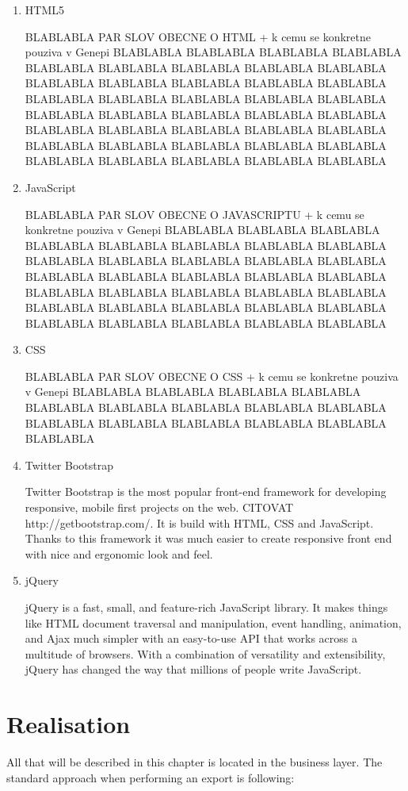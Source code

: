 \documentclass[thesis=B,english]{FITthesis}[2012/10/20]
\begin{document}
\begin{enumerate}

\item{HTML5}

BLABLABLA PAR SLOV OBECNE O HTML + k cemu se konkretne pouziva v Genepi
BLABLABLA BLABLABLA BLABLABLA BLABLABLA BLABLABLA BLABLABLA BLABLABLA BLABLABLA BLABLABLA BLABLABLA BLABLABLA BLABLABLA BLABLABLA BLABLABLA BLABLABLA BLABLABLA BLABLABLA BLABLABLA BLABLABLA BLABLABLA BLABLABLA BLABLABLA BLABLABLA BLABLABLA BLABLABLA BLABLABLA BLABLABLA BLABLABLA BLABLABLA BLABLABLA BLABLABLA BLABLABLA BLABLABLA BLABLABLA BLABLABLA BLABLABLA BLABLABLA BLABLABLA BLABLABLA 
\item{JavaScript}

BLABLABLA PAR SLOV OBECNE O JAVASCRIPTU + k cemu se konkretne pouziva v Genepi
BLABLABLA BLABLABLA BLABLABLA BLABLABLA BLABLABLA BLABLABLA BLABLABLA BLABLABLA BLABLABLA BLABLABLA BLABLABLA BLABLABLA BLABLABLA BLABLABLA BLABLABLA BLABLABLA BLABLABLA BLABLABLA BLABLABLA BLABLABLA BLABLABLA BLABLABLA BLABLABLA BLABLABLA BLABLABLA BLABLABLA BLABLABLA BLABLABLA BLABLABLA BLABLABLA BLABLABLA BLABLABLA BLABLABLA 
\item{CSS}

BLABLABLA PAR SLOV OBECNE O CSS + k cemu se konkretne pouziva v Genepi
BLABLABLA BLABLABLA BLABLABLA BLABLABLA BLABLABLA BLABLABLA BLABLABLA BLABLABLA BLABLABLA BLABLABLA BLABLABLA BLABLABLA BLABLABLA BLABLABLA BLABLABLA 
\item{Twitter Bootstrap}

Twitter Bootstrap is the most popular front-end framework for developing responsive, mobile first projects on the web. CITOVAT http://getbootstrap.com/. It is build with HTML, CSS and JavaScript. Thanks to this framework it was much easier to create responsive front end with nice and ergonomic look and feel.

\item{jQuery}

jQuery is a fast, small, and feature-rich JavaScript library. It makes things like HTML document traversal and manipulation, event handling, animation, and Ajax much simpler with an easy-to-use API that works across a multitude of browsers. With a combination of versatility and extensibility, jQuery has changed the way that millions of people write \cite{JJ92} JavaScript.
\end{enumerate}

\chapter{Realisation}
All that will be described in this chapter is located in the business layer. The standard approach when performing an export is following:
\end{document}
